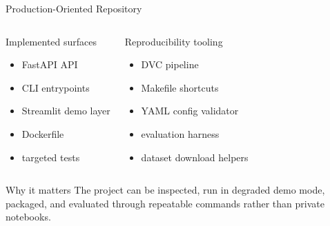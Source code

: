 \begin{frame}[shrink=10]{Production-Oriented Repository}
  \begin{columns}[T]
    \begin{block}{Implemented surfaces}
      \small
      \begin{itemize}
        \item FastAPI API
        \item CLI entrypoints
        \item Streamlit demo layer
        \item Dockerfile
        \item targeted tests
      \end{itemize}
    \end{block}
    \begin{exampleblock}{Reproducibility tooling}
      \small
      \begin{itemize}
        \item DVC pipeline
        \item Makefile shortcuts
        \item YAML config validator
        \item evaluation harness
        \item dataset download helpers
      \end{itemize}
    \end{exampleblock}
  \end{columns}
  \vspace{0.15cm}
  \begin{alertblock}{Why it matters}
    The project can be inspected, run in degraded demo mode, packaged, and evaluated through repeatable commands rather than private notebooks.
  \end{alertblock}
\end{frame}
